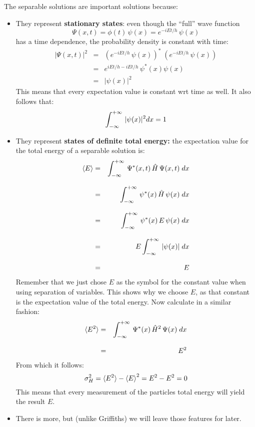 \documentclass[12pt]{book}
\begin{document}
\noindent
The separable solutions are important solutions because:
\begin{itemize}
\item They represent {\bf stationary states}:  even though the ``full'' wave function
\begin{equation*}
\Psi(x,t) = \phi(t) \, \psi(x) = e^{-iEt/h} \, \psi(x)
\end{equation*}
has a time dependence, the probability density is constant with time:
\begin{eqnarray*}
|\Psi(x,t)|^2 &=& \left(e^{-iEt/h} \, \psi(x)\right)^* \; \left(e^{-iEt/h} \, \psi(x)\right)\\[8pt]
&=& e^{iEt/h-iEt/h} \, \psi^*(x) \psi(x)\\[8pt]
&=& | \psi(x) |^2
\end{eqnarray*}
This means that every expectation value is constant wrt time as well.  It also follows that:
\begin{equation*}
\int_{-\infty}^{+\infty}\, |\psi(x)|^2 dx = 1\\
\end{equation*}

\item They represent {\bf states of definite total energy:} the expectation value for the total energy of a separable solution is:
\begin{eqnarray*}
\braket{E} &=& \int_{-\infty}^{+\infty}\, \Psi^*(x,t) \, \hat{H} \, \Psi(x,t) \; dx \\[8pt]
           &=& \int_{-\infty}^{+\infty}\, \psi^*(x) \, \hat{H} \, \psi(x) \; dx \\[8pt]
           &=& \int_{-\infty}^{+\infty}\, \psi^*(x) \, E \, \psi(x) \; dx \\[8pt]
           &=& E \int_{-\infty}^{+\infty}\, |\psi(x)| \; dx \\[8pt]
           &=& E           
\end{eqnarray*}
Remember that we just chose $E$ as the symbol for the constant value when using separation of variables.  This shows why we choose $E$, as that constant is the expectation value of the total energy.  Now calculate in a similar fashion:
\begin{eqnarray*}
\braket{E^2} &=& \int_{-\infty}^{+\infty}\, \Psi^*(x) \, \hat{H}^2 \, \Psi(x) \; dx \\[8pt]
           &=& E^2
\end{eqnarray*}
From which it follows:
\begin{equation*}
\sigma^2_H = \braket{E^2} - \braket{E}^2 = E^2 - E^2 = 0
\end{equation*}
This means that every measurement of the particles total energy will yield the result $E$.
\item There is more, but (unlike Griffiths) we will leave those features for later.
\end{itemize}
\end{document}
